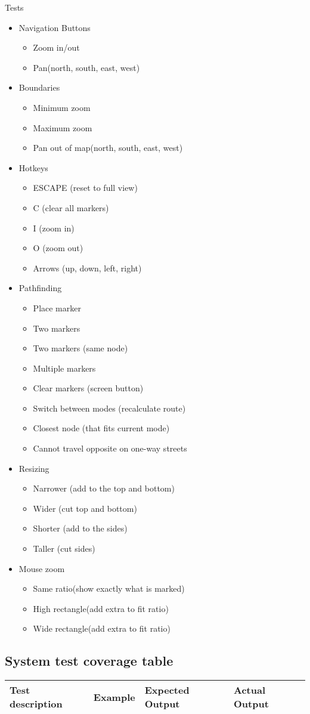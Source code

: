 Tests
\begin{itemize}
  \item Navigation Buttons
  \begin{itemize}
   \item Zoom in/out
   \item Pan(north, south, east, west)
   \end{itemize}
  \item Boundaries 
  \begin{itemize}
    \item Minimum zoom
    \item Maximum zoom
    \item Pan out of map(north, south, east, west) 
   \end{itemize}
  \item Hotkeys
  \begin{itemize}
   \item ESCAPE (reset to full view)
   \item C (clear all markers)
   \item I (zoom in)
   \item O (zoom out)
   \item Arrows (up, down, left, right)
  \end{itemize}
  \item Pathfinding 
  \begin{itemize}
   \item Place marker
   \item Two markers
   \item Two markers (same node)
   \item Multiple markers
   \item Clear markers (screen button)
   \item Switch between modes (recalculate route)
   \item Closest node (that fits current mode)
   \item Cannot travel opposite on one-way streets
  \end{itemize}
  \item Resizing 
  \begin{itemize}
   \item Narrower (add to the top and bottom)
   \item Wider (cut top and bottom)
   \item Shorter (add to the sides)
   \item Taller (cut sides)
  \end{itemize}
  \item Mouse zoom 
  \begin{itemize}
   \item Same ratio(show exactly what is marked)
   \item High rectangle(add extra to fit ratio)
   \item Wide rectangle(add extra to fit ratio)
  \end{itemize}
\end{itemize}
\subsection{System test coverage table}
\begin{centering}
\begin{longtable}{|p{3.5cm}|p{3cm}|p{3cm}|p{3cm}|}
\hline
Test description & Example & Expected Output & Actual Output\\
\hline
\hline

\end{longtable}
\end{centering}